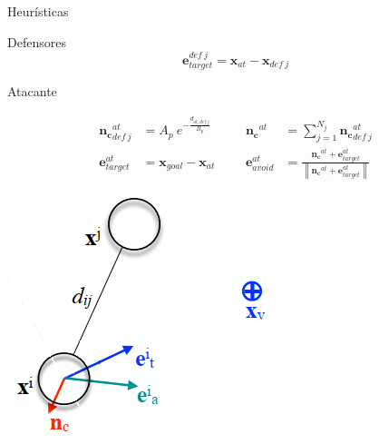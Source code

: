 \begin{frame}{Heurísticas}
    \begin{block}{Defensores}
        \footnotesize{}
        \begin{equation*}
            \mathbf{e}_{target}^{def\ j} = \mathbf{x}_{at} - \mathbf{x}_{def\ j}
        \end{equation*}
    \end{block}
    \begin{block}{Atacante}
        \footnotesize{
        }
        \begin{minipage}{0.75\linewidth}
            \begin{equation*}
                \begin{aligned}
                    \mathbf{n_c}_{def\ j}^{at} &= A_p\ e^{-\frac{d_{at,def\ j}}{B_p}} &&& \mathbf{n_c}^{at} &= \sum_{j=1}^{N_j} \mathbf{n_c}_{def\ j}^{at} \\
                    \mathbf{e}_{target}^{at} &= \mathbf{x}_{goal} - \mathbf{x}_{at} &&& \mathbf{e}_{avoid}^{at} &= \frac{\mathbf{n_c}^{at} + \mathbf{e}_{target}^{at}}{\left\| \mathbf{n_c}^{at} + \mathbf{e}_{target}^{at} \right\|}
                \end{aligned}
            \end{equation*}
        \end{minipage}
        \begin{minipage}{0.2\linewidth}
            \includegraphics[width=\textwidth]{pic/01-introduccion/cpm-modified}
        \end{minipage}
    \end{block}
\end{frame}




